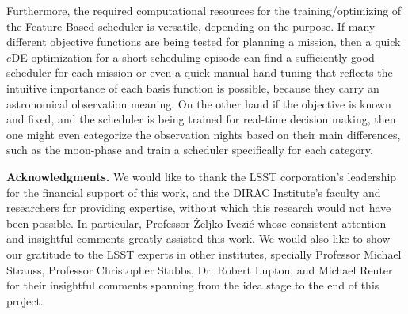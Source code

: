 \documentclass[11pt]{article}
\theoremstyle{definition}
\begin{document}
Furthermore, the required computational resources for the training/optimizing of the Feature-Based scheduler is versatile, depending on the purpose. If many different objective functions are being tested for planning a mission, then a quick $e$DE optimization for a short scheduling episode can find a sufficiently good scheduler for each mission or even a quick manual hand tuning that reflects the intuitive importance of each basis function is possible, because they carry an astronomical observation meaning. On the other hand if the objective is known and fixed, and the scheduler is being trained for real-time decision making, then one might even categorize the observation nights based on their main differences, such as the moon-phase and train a scheduler specifically for each category. 


\textbf{Acknowledgments.} We would like to thank the LSST corporation's leadership for the financial support of this work, and the DIRAC Institute's faculty and researchers for providing expertise, without which this research would not have been possible. In particular, Professor \v{Z}eljko Ivezi\'{c} whose consistent attention and insightful comments greatly assisted this work. We would also like to show our gratitude to the LSST experts in other institutes, specially Professor Michael Strauss, Professor Christopher Stubbs, Dr. Robert Lupton, and Michael Reuter for their insightful comments spanning from the idea stage to the end of this project.


%

%
\end{document}
